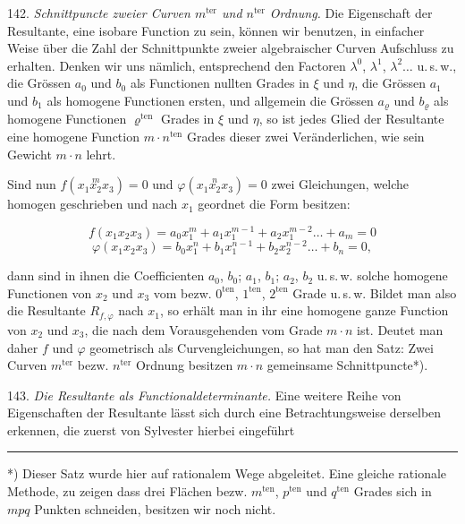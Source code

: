 \documentclass[11pt]{article}
\begin{document}
142. \textit{Schnittpuncte zweier Curven $m^{\text{ter}}$ und $n^{\text{ter}}$ Ordnung.} Die
Eigenschaft der Resultante, eine isobare Function zu sein, k\"onnen wir benutzen, in
einfacher Weise \"uber die Zahl der Schnittpunkte zweier algebraischer Curven Aufschluss zu
erhalten. Denken wir uns n\"amlich, entsprechend den Factoren $\lambda^0$, $\lambda^1$,
$\lambda^2\ldots$ u.\,s.\,w., die Gr\"ossen $a_0$ und $b_0$ als Functionen nullten Grades in
$\xi$ und $\eta$, die Gr\"ossen $a_1$ und $b_1$ als homogene Functionen ersten, und allgemein
die Gr\"ossen $a_\varrho$ und $b_\varrho$ als homogene Functionen $\varrho^{\text{ten}}$
Grades in $\xi$ und $\eta$, so ist jedes Glied der Resultante eine homogene Function
$m\cdot n^{\text{ten}}$ Grades dieser zwei Ver\"anderlichen, wie sein Gewicht $m\cdot n$
lehrt.

Sind nun $f(x_1\overset{m}{x_2}x_3) = 0$ und $\varphi(x_1\overset{n}{x_2}x_3) = 0$ zwei
Gleichungen, welche homogen geschrieben und nach $x_1$ geordnet die Form besitzen:

\[ f(x_1x_2x_3) = a_0x_1^m + a_1x_1^{m-1} + a_2x_1^{m-2}\ldots + a_m = 0 \]
\[ \varphi(x_1x_2x_3) = b_0x_1^n + b_1x_1^{n-1} + b_2x_2^{n-2}\ldots + b_n = 0, \] %

dann sind in ihnen die Coefficienten $a_0$, $b_0$; $a_1$, $b_1$; $a_2$, $b_2$ u.\,s.\,w.
solche homogene Functionen von $x_2$ und $x_3$ vom bezw. $0^{\text{ten}}$,
$1^{\text{ten}}$, $2^{\text{ten}}$ Grade u.\,s.\,w. Bildet man also die Resultante
$R_{f,\varphi}$ nach $x_1$, so erh\"alt man in ihr eine homogene ganze Function von $x_2$
und $x_3$, die nach dem Vorausgehenden vom Grade $m\cdot n$ ist. Deutet man daher $f$ und
$\varphi$ geometrisch als Curvengleichungen, so hat man den Satz: Zwei Curven
$m^{\text{ter}}$ bezw. $n^{\text{ter}}$ Ordnung besitzen $m\cdot n$ gemeinsame
Schnittpuncte*).

143. \textit{Die Resultante als Functionaldeterminante.} Eine weitere Reihe von
Eigenschaften der Resultante l\"asst sich durch eine Betrachtungsweise derselben erkennen,
die zuerst von Sylvester hierbei eingef\"uhrt

\bigskip\noindent\rule{4cm}{0.4pt}

\smallskip\noindent
*) Dieser Satz wurde hier auf rationalem Wege abgeleitet. Eine gleiche rationale Methode, zu
zeigen dass drei Fl\"achen bezw. $m^{\text{ten}}$, $p^{\text{ten}}$ und $q^{\text{ten}}$
Grades sich in $mpq$ Punkten schneiden, besitzen wir noch nicht.
\end{document}
